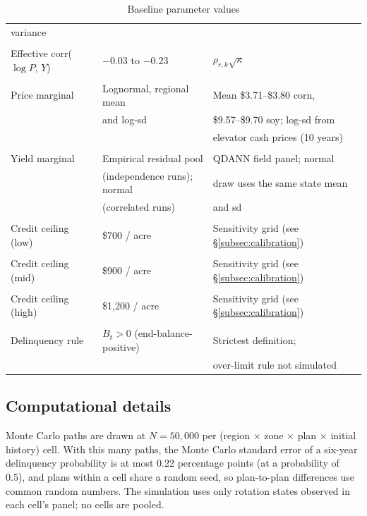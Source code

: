 \documentclass[11pt,letterpaper]{article}
\theoremstyle{remark}
\begin{document}
\begin{table}[!ht]
\begin{tabular}{lll}
variance & & \\
\\
Effective corr($\log P$, $Y$) & $-0.03$ to $-0.23$ & $\rho_{r,k}\sqrt{\kappa}$\\
\\
Price marginal & Lognormal, regional mean & Mean \$3.71--\$3.80 corn,\\
& and log-sd & \$9.57--\$9.70 soy; log-sd from\\
& & elevator cash prices (10 years)\\
\\
Yield marginal & Empirical residual pool & QDANN field panel; normal\\
& (independence runs); normal & draw uses the same state mean\\
& (correlated runs) & and sd\\
\\
Credit ceiling (low) & \$700 / acre & Sensitivity grid (see \S\ref{subsec:calibration})\\
\\
Credit ceiling (mid) & \$900 / acre & Sensitivity grid (see \S\ref{subsec:calibration})\\
\\
Credit ceiling (high) & \$1,200 / acre & Sensitivity grid (see \S\ref{subsec:calibration}) \\
\\
Delinquency rule & $B_t > 0$ (end-balance-positive) & Strictest definition;\\
& & over-limit rule not simulated\\
\bottomrule
\end{tabular}
\caption{Baseline parameter values}
\label{tab:baseline_pars}
\end{table}

\newpage

\subsection{\label{sec:comp_details}Computational details}

Monte Carlo paths are drawn at $N = 50{,}000$ per (region $\times$ zone $\times$ plan $\times$ initial history) cell. With this many paths, the Monte Carlo standard error of a six-year delinquency probability is at most 0.22 percentage points (at a probability of 0.5), and plans within a cell share a random seed, so plan-to-plan differences use common random numbers. The simulation uses only rotation states observed in each cell's panel; no cells are pooled.
\end{document}
